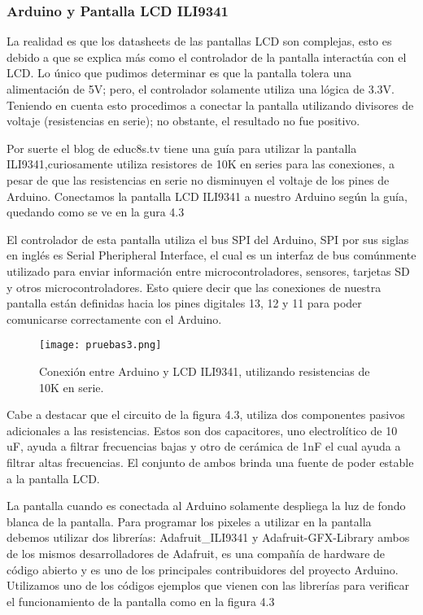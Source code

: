 \subsubsection{Arduino y Pantalla LCD ILI9341}
\par 
La realidad es que los datasheets de las pantallas LCD son complejas, esto es debido a que se explica más como el controlador de la pantalla interactúa con el LCD. Lo único que pudimos determinar es que la pantalla tolera una alimentación de 5V; pero, el controlador solamente utiliza una lógica de 3.3V. Teniendo en cuenta esto procedimos a conectar la pantalla utilizando divisores de voltaje (resistencias en serie); no obstante, el resultado no fue positivo.

\par \noindent
Por suerte el blog de educ8s.tv\cite{edu8tv} tiene una guía para utilizar la pantalla ILI9341,curiosamente utiliza resistores de 10K en series para las conexiones, a pesar de que las resistencias en serie no disminuyen el voltaje de los pines de Arduino. Conectamos la pantalla LCD ILI9341 a nuestro Arduino según la guía, quedando como se ve en la  gura 4.3

\par \noindent
El controlador de esta pantalla utiliza el bus SPI del Arduino, SPI por sus siglas en inglés es Serial Pheripheral Interface, el cual es un interfaz de bus comúnmente utilizado para enviar información entre microcontroladores, sensores, tarjetas SD y otros microcontroladores. Esto quiere decir que las conexiones de nuestra pantalla están definidas hacia los pines digitales 13, 12 y 11 para poder comunicarse correctamente con el Arduino.

\begin{figure}[H]
	\centering
	\texttt{[image: pruebas3.png]}
	\caption{Conexión entre Arduino y LCD ILI9341, utilizando resistencias de 10K en serie.}
\end{figure}

\clearpage

\par \noindent
Cabe a destacar que el circuito de la figura 4.3, utiliza dos componentes pasivos adicionales a las resistencias. Estos son dos capacitores, uno electrolítico de 10 uF, ayuda a filtrar frecuencias bajas y otro de cerámica de 1nF el cual ayuda a filtrar altas frecuencias. El conjunto de ambos brinda una fuente de poder estable a la pantalla LCD.

\par \noindent
La pantalla cuando es conectada al Arduino solamente despliega la luz de fondo blanca de la pantalla. Para programar los pixeles a utilizar en la pantalla debemos utilizar dos librerías: Adafruit\_ILI9341\cite{adafruit-lcd} y Adafruit-GFX-Library\cite{adafruit-gfx} ambos de los mismos desarrolladores de Adafruit, es una compañía de hardware de código abierto y es uno de los principales contribuidores del proyecto Arduino. Utilizamos uno de los códigos ejemplos que vienen con las librerías para verificar el funcionamiento de la pantalla como en la figura 4.3

